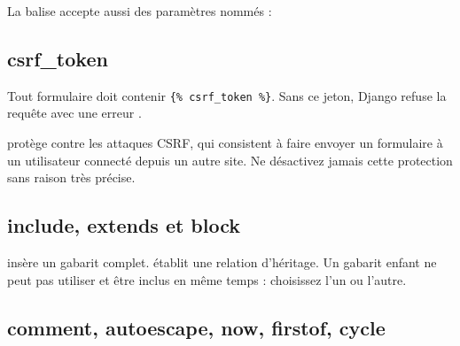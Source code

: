 La balise  accepte aussi des paramètres nommés :


\subsection{csrf\_token}

Tout formulaire  doit contenir \lstinline|{% csrf_token %}|. Sans ce
jeton, Django refuse la requête avec une erreur .


\begin{attention}
 protège contre les attaques CSRF, qui consistent à faire
envoyer un formulaire à un utilisateur connecté depuis un autre site. Ne
désactivez jamais cette protection sans raison très précise.
\end{attention}

\subsection{include, extends et block}


 insère un gabarit complet.  établit une relation
d'héritage. Un gabarit enfant ne peut pas utiliser  et être inclus
en même temps : choisissez l'un ou l'autre.

\subsection{comment, autoescape, now, firstof, cycle}


